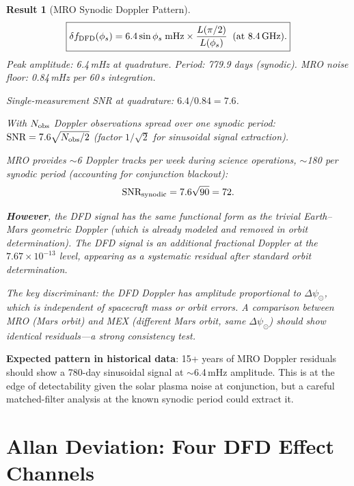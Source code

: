 \documentclass[aps,prd,twocolumn,superscriptaddress]{revtex4-2}
\newtheorem{result}{Result}
\begin{document}
\begin{result}[MRO Synodic Doppler Pattern]
\label{res:MRO-Doppler}
\begin{equation}
\boxed{
\delta f_{\rm DFD}(\phi_s) = 6.4\sin\phi_s\;\text{mHz}
\times\frac{L(\pi/2)}{L(\phi_s)}\;\;(\text{at 8.4\,GHz}).
}
\label{eq:MRO-Doppler}
\end{equation}
Peak amplitude: 6.4\,mHz at quadrature.
Period: 779.9 days (synodic).
MRO noise floor: 0.84\,mHz per 60\,s integration.

Single-measurement SNR at quadrature: $6.4/0.84 = 7.6$.

With $N_{\rm obs}$ Doppler observations spread over one synodic period:
$\text{SNR} = 7.6\sqrt{N_{\rm obs}/2}$ (factor $1/\sqrt{2}$ for
sinusoidal signal extraction).

MRO provides $\sim$6 Doppler tracks per week during science operations,
$\sim$180 per synodic period (accounting for conjunction blackout):
\begin{equation}
\text{SNR}_{\rm synodic} = 7.6\sqrt{90} = 72.
\end{equation}

\textbf{However}, the DFD signal has the same functional form as
the trivial Earth--Mars geometric Doppler (which is already modeled
and removed in orbit determination). The DFD signal is an
\emph{additional} fractional Doppler at the $7.67\times10^{-13}$
level, appearing as a systematic residual after standard orbit
determination.

The key discriminant: the DFD Doppler has amplitude proportional to
$\Delta\psi_\odot$, which is independent of spacecraft mass or
orbit errors. A comparison between MRO (Mars orbit) and MEX
(different Mars orbit, same $\Delta\psi_\odot$) should show
\emph{identical} residuals---a strong consistency test.
\end{result}

\textbf{Expected pattern in historical data}: 15+ years of MRO
Doppler residuals should show a 780-day sinusoidal signal at
$\sim$6.4\,mHz amplitude. This is at the edge of detectability
given the solar plasma noise at conjunction, but a careful
matched-filter analysis at the known synodic period could
extract it.


\section{Allan Deviation: Four DFD Effect Channels}
\label{sec:Allan-channels}
\end{document}
